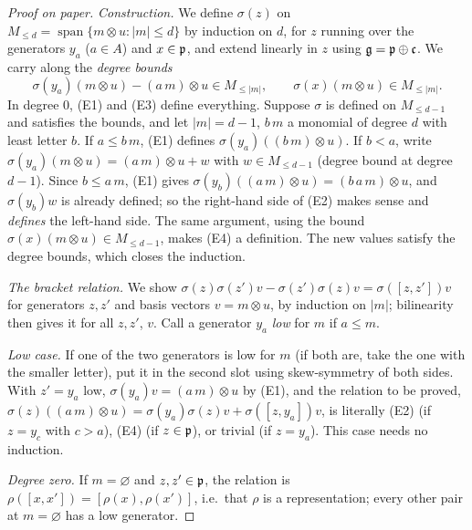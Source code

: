 \begin{proof}[Proof on paper]
\emph{Construction.} We define $\sigma(z)$ on $M_{\le d} = \operatorname{span}\{m\otimes u : |m|\le d\}$ by
induction on $d$, for $z$ running over the generators $y_a$ ($a\in A$) and $x\in\mathfrak{p}$, and extend linearly
in $z$ using $\mathfrak{g} = \mathfrak{p}\oplus\mathfrak c$. We carry along the \emph{degree bounds}
\begin{equation*}
 \sigma(y_a)(m\otimes u) - (a\,m)\otimes u\in M_{\le|m|},\qquad \sigma(x)(m\otimes u)\in M_{\le|m|}.
\end{equation*}
In degree $0$, (E1) and (E3) define everything. Suppose $\sigma$ is defined on $M_{\le d-1}$ and satisfies the
bounds, and let $|m| = d - 1$, $b\,m$ a monomial of degree $d$ with least letter $b$. If $a\le b\,m$, (E1)
defines $\sigma(y_a)((b\,m)\otimes u)$. If $b<a$, write $\sigma(y_a)(m\otimes u) = (a\,m)\otimes u + w$ with
$w\in M_{\le d-1}$ (degree bound at degree $d-1$). Since $b\le a\,m$, (E1) gives
$\sigma(y_b)((a\,m)\otimes u) = (b\,a\,m)\otimes u$, and $\sigma(y_b)w$ is already defined; so the right-hand
side of (E2) makes sense and \emph{defines} the left-hand side. The same argument, using the bound
$\sigma(x)(m\otimes u)\in M_{\le d-1}$, makes (E4) a definition. The new values satisfy the degree bounds, which
closes the induction.

\emph{The bracket relation.} We show $\sigma(z)\sigma(z')v - \sigma(z')\sigma(z)v = \sigma([z,z'])v$ for
generators $z, z'$ and basis vectors $v = m\otimes u$, by induction on $|m|$; bilinearity then gives it for
all $z, z'$, $v$. Call a generator $y_a$ \emph{low} for $m$ if $a\le m$.

\emph{Low case.} If one of the two generators is low for $m$ (if both are, take the one with the smaller
letter), put it in the second slot using skew-symmetry of both sides. With $z' = y_a$ low, $\sigma(y_a)v =
(a\,m)\otimes u$ by (E1), and the relation to be proved, $\sigma(z)((a\,m)\otimes u) = \sigma(y_a)\sigma(z)v +
\sigma([z,y_a])v$, is literally (E2) (if $z = y_c$ with $c>a$), (E4) (if $z\in\mathfrak{p}$), or trivial (if $z = y_a$).
This case needs no induction.

\emph{Degree zero.} If $m = \varnothing$ and $z, z'\in\mathfrak{p}$, the relation is $\rho([x,x']) =
[\rho(x),\rho(x')]$, i.e.\ that $\rho$ is a representation; every other pair at $m=\varnothing$ has a low
generator.


\end{proof}
